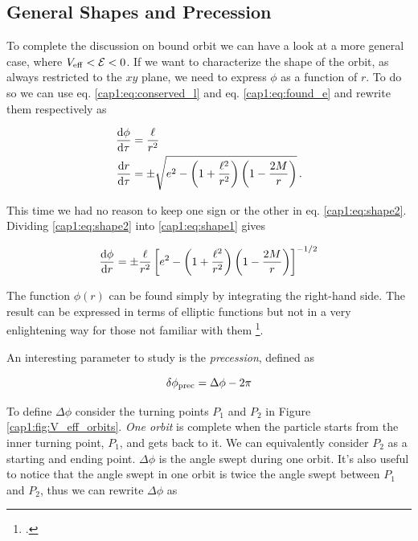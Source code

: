 \subsection{General Shapes and Precession}
\label{cap1:sec:precession}

To complete the discussion on bound orbit we can have a look at a more general
case, where $V_{\rm eff} < \mathcal E < 0$.
If we want to characterize the shape of the orbit, as always restricted to the
$xy$ plane, we need to express $\phi$ as a function of $r$.
To do so we can use eq. \ref{cap1:eq:conserved_l} and eq. \ref{cap1:eq:found_e}
and rewrite them respectively as

\begin{subequations}
\begin{align}
    \dv{\phi}{\tau} &= \frac{\ell}{r^2} \label{cap1:eq:shape1} \\
    \dv{r}{\tau} &= \pm \sqrt{e^2 - \left(1 + \frac{\ell^2}{r^2}\right)
    \left(1 - \frac{2M}{r}\right)} \label{cap1:eq:shape2} \, .
\end{align}
\label{cap1:eq:to_find_shape}
\end{subequations}

This time we had no reason to keep one sign or the other in eq.
\ref{cap1:eq:shape2}.
Dividing \ref{cap1:eq:shape2} into \ref{cap1:eq:shape1} gives

\begin{equation}
    \dv{\phi}{r} = \pm \frac{\ell}{r^2}
    \left[e^2 - \left(1 + \frac{\ell^2}{r^2}\right)
    \left(1 - \frac{2M}{r}\right)\right]^{-1/2}
    \label{cap1:eq:shape}
\end{equation}

The function $\phi(r)$ can be found simply by integrating the right-hand side.
The result can be expressed in terms of elliptic functions but not in a very
enlightening way for those not familiar with them
\footcite[page 202]{hartle2021gravity}.

An interesting parameter to study is the \textit{precession}, defined as

\begin{equation}
    \delta \phi_{\rm prec} = \Delta \phi - 2 \pi
    \label{cap1:eq:precession}
\end{equation}

To define $\Delta \phi$ consider the turning points $P_1$ and $P_2$ in Figure
\ref{cap1:fig:V_eff_orbits}.
\textit{One orbit} is complete when the particle starts from the inner turning
point, $P_1$, and gets back to it.
We can equivalently consider $P_2$ as a starting and ending point.
$\Delta \phi$ is the angle swept during one orbit.
It's also useful to notice that the angle swept in one orbit is twice the angle
swept between $P_1$ and $P_2$, thus we can rewrite $\Delta \phi$ as

